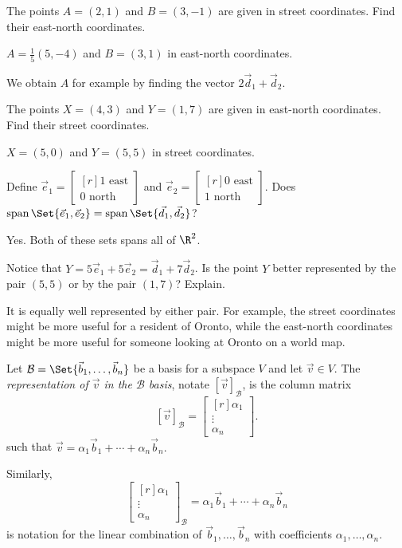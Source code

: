 \documentclass{problemset}
\DeclareMathOperator{\Span}{span}
\newcommand{\mat}[1]{\begin{bmatrix*}[r]#1\end{bmatrix*}}
\begin{document}
	\begin{parts}
		\item The points $A=(2,1)$ and $B=(3,-1)$ are given in street coordinates.
			Find their east-north coordinates.
			\begin{solution}
				$A=\frac{1}{5}(5,-4)$ and $B=(3,1)$ in east-north coordinates.

				We obtain $A$ for example by finding the vector $2\vec d_1+\vec d_2$. 
			\end{solution}
		\item The points $X=(4,3)$ and $Y=(1,7)$ are given in east-north coordinates. 
			Find their street coordinates.
			\begin{solution}[inline]
				$X=(5,0)$ and $Y=(5,5)$ in street coordinates.
			\end{solution}
		\item Define $\vec e_1=\mat{1\text{ east}\\0\text{ north}}$ and 
			$\vec e_2=\mat{0\text{ east}\\1\text{ north}}$.
			Does $\Span\Set{\vec e_1,\vec e_2} = \Span\Set{\vec d_1,\vec d_2}$?
			\begin{solution}
				Yes. Both of these sets spans all of $\R^2$. 
			\end{solution}
		\item Notice that $Y=5\vec e_1+5\vec e_2 = \vec d_1+7\vec d_2$. Is the point $Y$
			better represented by the pair $(5,5)$ or by the pair $(1,7)$? Explain.
			\begin{solution}
				It is equally well represented by either pair. For example, the
				street coordinates might be more useful for a resident of Oronto,
				while the east-north coordinates might be more useful for someone
				looking at Oronto on a world map. 
			\end{solution}
	\end{parts}

	\begin{definition}
		Let $\mathcal B=\Set{\vec b_1,\ldots,\vec b_n}$ be a basis for a subspace $V$
		and let $\vec v\in V$. The \emph{representation of $\vec v$ in the $\mathcal B$
		basis}, notate $[\vec v]_{\mathcal B}$,
		is the column matrix
		\[
			[\vec v]_{\mathcal B} = \mat{\alpha_1\\\vdots\\\alpha_n}.
		\]
		such that $
			\vec v=\alpha_1\vec b_1+\cdots+\alpha_n\vec b_n.
		$

		Similarly,
		\[
			\mat{\alpha_1\\\vdots\\\alpha_n}_{\mathcal B}
			= \alpha_1\vec b_1+\cdots +\alpha_n\vec b_n
		\]
		is notation for the linear combination of $\vec b_1,\ldots,\vec b_n$ with
		coefficients $\alpha_1,\ldots,\alpha_n$.
	\end{definition}
\end{document}
